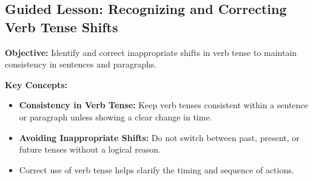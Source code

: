 \documentclass[12pt]{article}
\title{}
\date{}
\begin{document}
\subsection*{Guided Lesson: Recognizing and Correcting Verb Tense Shifts}
\onehalfspacing

\begin{tcolorbox}[colframe=black!40, colback=gray!5, 
coltitle=black, colbacktitle=black!20, fonttitle=\bfseries\Large, 
title=Learning Objective, halign title=center, left=5pt, right=5pt, top=5pt, bottom=15pt]
\textbf{Objective:} Identify and correct inappropriate shifts in verb tense to maintain consistency in sentences and paragraphs.
\end{tcolorbox}

\vspace{1em}

\begin{tcolorbox}[colframe=black!60, colback=white, 
coltitle=black, colbacktitle=black!15, fonttitle=\bfseries\Large, 
title=Key Concepts and Vocabulary, halign title=center, left=10pt, right=10pt, top=10pt, bottom=15pt]
\textbf{Key Concepts:}
\begin{itemize}
    \item \textbf{Consistency in Verb Tense:} Keep verb tenses consistent within a sentence or paragraph unless showing a clear change in time.
    \item \textbf{Avoiding Inappropriate Shifts:} Do not switch between past, present, or future tenses without a logical reason.
    \item Correct use of verb tense helps clarify the timing and sequence of actions.
\end{itemize}
\end{tcolorbox}

\vspace{1em}
\end{document}
